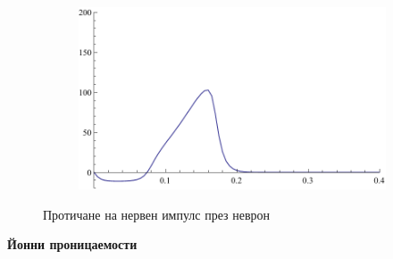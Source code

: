 \documentclass{article}
\numberwithin{equation}{section}
\begin{document}
\begin{figure}[H]
\begin{subfigure}[t]{0.3\textwidth}
        \end{subfigure}
        ~ %
        \begin{subfigure}[t]{0.3\textwidth}
            \includegraphics[width=\textwidth]{./schemas/Neuron3.pdf}
        \end{subfigure}
        \caption{Протичане на нервен импулс през неврон}\label{fig:neural_impulse}
    \end{figure}
    
    \textbf{Йонни проницаемости}
    
\end{document}
